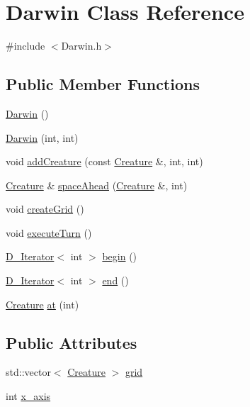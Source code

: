 \hypertarget{classDarwin}{\section{Darwin Class Reference}
\label{classDarwin}
}


{\ttfamily \#include $<$Darwin.\-h$>$}

\subsection*{Public Member Functions}
\begin{DoxyCompactItemize}
\item 
\hyperlink{classDarwin_a0bd882cc82538795f11b8ac3a8eb7965}{Darwin} ()
\item 
\hyperlink{classDarwin_ab2010af755d3a8d45dc5945f5fcb5f41}{Darwin} (int, int)
\item 
void \hyperlink{classDarwin_acabe80a6217002550295d351b1e663da}{add\-Creature} (const \hyperlink{classCreature}{Creature} \&, int, int)
\item 
\hyperlink{classCreature}{Creature} \& \hyperlink{classDarwin_ae6fc084b4fba0f955c61cf7a309c1a09}{space\-Ahead} (\hyperlink{classCreature}{Creature} \&, int)
\item 
void \hyperlink{classDarwin_afbf99ffd2eadd71b2416449be4f05c04}{create\-Grid} ()
\item 
void \hyperlink{classDarwin_a952661ed4a484bc696ad14dee51183d1}{execute\-Turn} ()
\item 
\hyperlink{classD__Iterator}{D\-\_\-\-Iterator}$<$ int $>$ \hyperlink{classDarwin_af36439bd934e1da2cf3f2862405f99c3}{begin} ()
\item 
\hyperlink{classD__Iterator}{D\-\_\-\-Iterator}$<$ int $>$ \hyperlink{classDarwin_ab14bf3d45b3b07c9e85308b3aa88df53}{end} ()
\item 
\hyperlink{classCreature}{Creature} \hyperlink{classDarwin_a58cf206feee78dc2f17ef88a62791b83}{at} (int)
\end{DoxyCompactItemize}
\subsection*{Public Attributes}
\begin{DoxyCompactItemize}
\item 
std\-::vector$<$ \hyperlink{classCreature}{Creature} $>$ \hyperlink{classDarwin_aad8346945d975c160f89deb2c62fab71}{grid}
\item 
int \hyperlink{classDarwin_a80597320a843e426956f743a8e334ff0}{x\-\_\-axis}
\end{DoxyCompactItemize}
